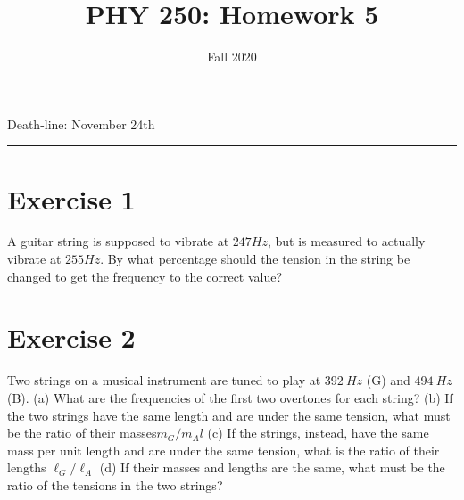 \documentclass[12pt]{article}
\title{PHY 250: Homework 5}
\author{Fall 2020}
\date{}
\newcommand{\blankline}{\quad\pagebreak[2]}
\begin{document}
\maketitle








\begin{center}
Death-line: November  24th    
\end{center}
\hrule









\section*{Exercise 1}


A guitar string is supposed to vibrate at $247 Hz$, but is measured
to actually vibrate at $255 Hz$. By what percentage should the
tension in the string be changed to get the frequency to the
correct value?


\section*{Exercise 2}

Two strings on a musical instrument are tuned to play at
$392~Hz$ (G) and $494~Hz$ (B). (a) What are the frequencies of
the first two overtones for each string? (b) If the two strings
have the same length and are under the same tension, what
must be the ratio of their masses$ m_G/m_Al$ (c) If the
strings, instead, have the same mass per unit length and are
under the same tension, what is the ratio of their lengths
$\ell_G/\ell_A$ (d) If their masses and lengths are the same, what
must be the ratio of the tensions in the two strings?
\end{document}
